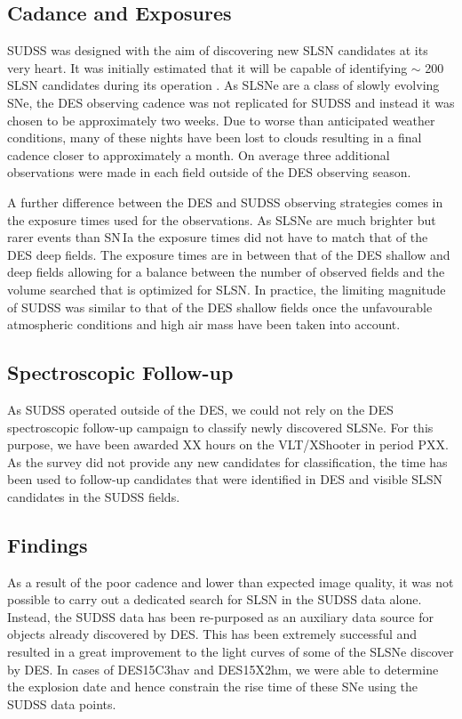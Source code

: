 \subsection{Cadance and Exposures}
\label{sec:SUDSSCadance}
SUDSS was designed with the aim of discovering new SLSN candidates at its very heart. It was initially estimated that it will be capable of identifying $\sim$ 200 SLSN candidates during its operation \citep{Papadopoulos2015}. As SLSNe are a class of slowly evolving SNe, the DES observing cadence was not replicated for SUDSS and instead it was chosen to be approximately two weeks. Due to worse than anticipated weather conditions, many of these nights have been lost to clouds resulting in a final cadence closer to approximately a month. On average three additional observations were made in each field outside of the DES observing season.

A further difference between the DES and SUDSS observing strategies comes in the exposure times used for the observations. As SLSNe are much brighter but rarer events than SN\,Ia the exposure times did not have to match that of the DES deep fields. The exposure times are in between that of the DES shallow and deep fields allowing for a balance between the number of observed fields and the volume searched that is optimized for SLSN. In practice, the limiting magnitude of SUDSS was similar to that of the DES shallow fields once the unfavourable atmospheric conditions and high air mass have been taken into account.

\subsection{Spectroscopic Follow-up}
As SUDSS operated outside of the DES, we could not rely on the DES spectroscopic follow-up campaign to classify newly discovered SLSNe. For this purpose, we have been awarded XX hours on the VLT/XShooter in period PXX. As the survey did not provide any new candidates for classification, the time has been used to follow-up candidates that were identified in DES and visible SLSN candidates in the SUDSS fields.

\subsection{Findings}
As a result of the poor cadence and lower than expected image quality, it was not possible to carry out a dedicated search for SLSN in the SUDSS data alone. Instead, the SUDSS data has been re-purposed as an auxiliary data source for objects already discovered by DES. This has been extremely successful and resulted in a great improvement to the light curves of some of the SLSNe discover by DES. In cases of DES15C3hav and DES15X2hm, we were able to determine the explosion date and hence constrain the rise time of these SNe using the SUDSS data points.

